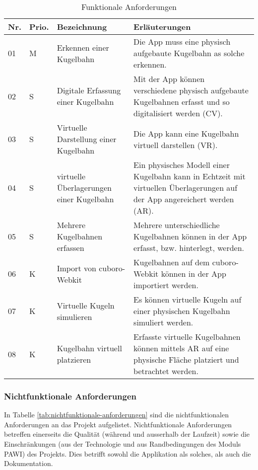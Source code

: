 \begin{table}
	\begin{tabular}{l l p{4.7cm} p{8cm}}
		\hline
		\textbf{Nr.} & \textbf{Prio.} & \textbf{Bezeichnung} & \textbf{Erläuterungen} \\
		\hline
		01 & M & Erkennen einer Kugelbahn & Die App muss eine physisch aufgebaute Kugelbahn as solche erkennen. \\
		02 & S & Digitale Erfassung einer Kugelbahn & Mit der App können verschiedene physisch aufgebaute Kugelbahnen erfasst und so digitalisiert werden (CV). \\
		03 & S & Virtuelle Darstellung einer Kugelbahn & Die App kann eine Kugelbahn virtuell darstellen (VR). \\
		04 & S & virtuelle Überlagerungen einer Kugelbahn & Ein physisches Modell einer Kugelbahn kann in Echtzeit mit virtuellen Überlagerungen auf der App angereichert werden (AR). \\
		05 & S & Mehrere Kugelbahnen erfassen & Mehrere unterschiedliche Kugelbahnen können in der App erfasst, bzw. hinterlegt, werden. \\
		06 & K & Import von cuboro-Webkit & Kugelbahnen auf dem cuboro-Webkit können in der App importiert werden. \\
		07 & K & Virtuelle Kugeln simulieren & Es können virtuelle Kugeln auf einer physischen Kugelbahn simuliert werden. \\
		08 & K & Kugelbahn virtuell platzieren & Erfasste virtuelle Kugelbahnen können mittels AR auf eine physische Fläche platziert und betrachtet werden. \\
		\hline
	\end{tabular}
	\caption{Funktionale Anforderungen}
	\label{tab:funktionale-anforderungen}
\end{table}

\subsubsection{Nichtfunktionale Anforderungen}
In Tabelle \ref{tab:nichtfunktionale-anforderungen} sind die nichtfunktionalen Anforderungen an das Projekt aufgelistet. Nichtfunktionale Anforderungen betreffen einerseits die Qualität (während und ausserhalb der Laufzeit) sowie die Einschränkungen (aus der Technologie und aus Randbedingungen des Moduls PAWI) des Projekts. Dies betrifft sowohl die Applikation als solches, als auch die Dokumentation.

